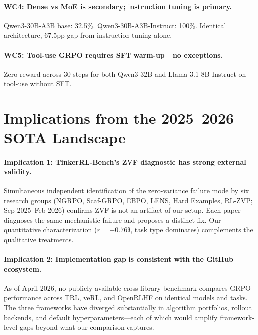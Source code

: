 \documentclass[12pt,a4paper]{report}
\theoremstyle{definition}
\begin{document}
\paragraph{WC4: Dense vs MoE is secondary; instruction tuning is primary.}
Qwen3-30B-A3B base: 32.5\%. Qwen3-30B-A3B-Instruct: 100\%. Identical architecture, 67.5pp gap from
instruction tuning alone.

\paragraph{WC5: Tool-use GRPO requires SFT warm-up---no exceptions.}
Zero reward across 30 steps for both Qwen3-32B and Llama-3.1-8B-Instruct on tool-use without SFT.

\section{Implications from the 2025--2026 SOTA Landscape}
\label{sec:sota-implications}

\paragraph{Implication 1: TinkerRL-Bench's ZVF diagnostic has strong external validity.}
Simultaneous independent identification of the zero-variance failure mode by six research groups
(NGRPO, Scaf-GRPO, EBPO, LENS, Hard Examples, RL-ZVP; Sep 2025--Feb 2026) confirms ZVF is not an
artifact of our setup. Each paper diagnoses the same mechanistic failure and proposes a distinct fix.
Our quantitative characterization ($r = -0.769$, task type dominates) complements the qualitative
treatments.

\paragraph{Implication 2: Implementation gap is consistent with the GitHub ecosystem.}
As of April 2026, no publicly available cross-library benchmark compares GRPO performance across TRL,
veRL, and OpenRLHF on identical models and tasks. The three frameworks have diverged substantially in
algorithm portfolios, rollout backends, and default hyperparameters---each of which would amplify
framework-level gaps beyond what our comparison captures.
\end{document}
